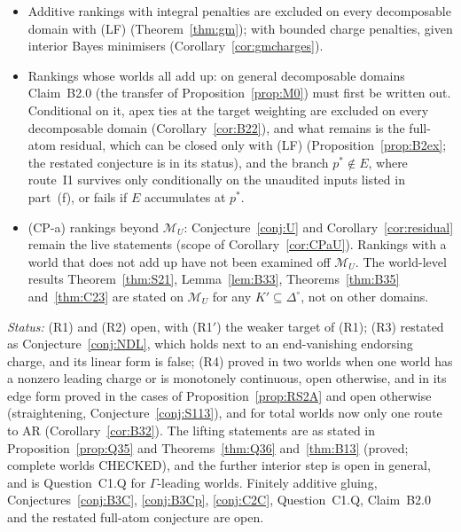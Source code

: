 \documentclass[11pt]{article}
\theoremstyle{definition}
\theoremstyle{remark}
\newcommand{\Di}{\Delta^{\circ}}
\newcommand{\M}{\mathcal M}
\begin{document}
\begin{itemize}[leftmargin=*]
\item Additive rankings with integral penalties are excluded on every decomposable domain with (LF) (Theorem~\ref{thm:gm}); with bounded charge penalties, given interior Bayes minimisers (Corollary~\ref{cor:gmcharges}).
\item Rankings whose worlds all add up: on general decomposable domains Claim~B2.0 (the transfer of Proposition~\ref{prop:M0}) must first be written out. Conditional on it, apex ties at the target weighting are excluded on every decomposable domain (Corollary~\ref{cor:B22}), and what remains is the full-atom residual, which can be closed only with (LF) (Proposition~\ref{prop:B2ex}; the restated conjecture is in its status), and the branch $p^*\notin E$, where route~I1 survives only conditionally on the unaudited inputs listed in part~(f), or fails if $E$ accumulates at $p^*$.
\item (CP-a) rankings beyond $\M_U$: Conjecture~\ref{conj:U} and Corollary~\ref{cor:residual} remain the live statements (scope of Corollary~\ref{cor:CPaU}). Rankings with a world that does not add up have not been examined off $\M_U$. The world-level results Theorem~\ref{thm:S21}, Lemma~\ref{lem:B33}, Theorems~\ref{thm:B35} and~\ref{thm:C23} are stated on $\M_U$ for any $K'\subseteq\Di$, not on other domains.
\end{itemize}
\emph{Status:} (R1) and (R2) open, with (R1$'$) the weaker target of (R1); (R3) restated as Conjecture~\ref{conj:NDL}, which holds next to an end-vanishing endorsing charge, and its linear form is false; (R4) proved in two worlds when one world has a nonzero leading charge or is monotonely continuous, open otherwise, and in its edge form proved in the cases of Proposition~\ref{prop:RS2A} and open otherwise (straightening, Conjecture~\ref{conj:S113}), and for total worlds now only one route to AR (Corollary~\ref{cor:B32}). The lifting statements are as stated in Proposition~\ref{prop:Q35} and Theorems~\ref{thm:Q36} and~\ref{thm:B13} (proved; complete worlds CHECKED), and the further interior step is open in general, and is Question~C1.Q for $\Gamma$-leading worlds. Finitely additive gluing, Conjectures~\ref{conj:B3C}, \ref{conj:B3Cp}, \ref{conj:C2C}, Question~C1.Q, Claim~B2.0 and the restated full-atom conjecture are open.
\end{document}
